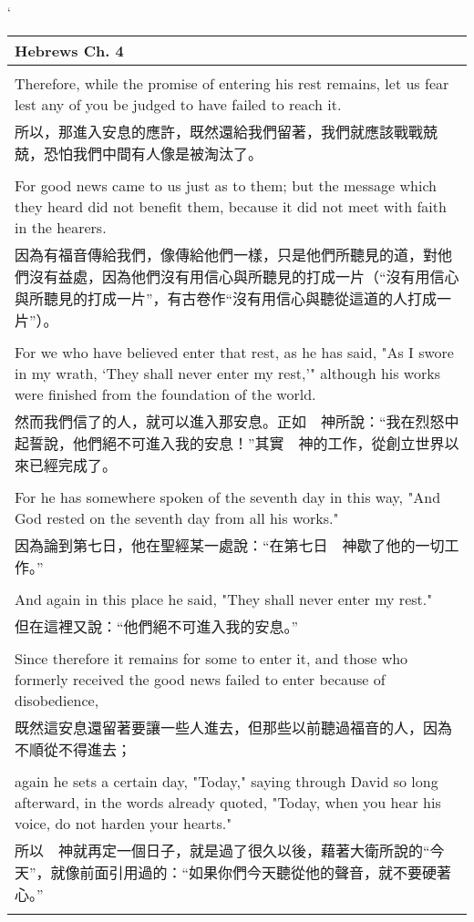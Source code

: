 \documentclass{book}
\begin{document}
\newpage
`
\begin{tabularx}{\textwidth}{p{}}
\hline
Hebrews Ch. 4 \\
\hline \\
Therefore, while the promise of entering his rest remains, let us fear lest any of you be judged to have failed to reach it. \\
所以，那進入安息的應許，既然還給我們留著，我們就應該戰戰兢兢，恐怕我們中間有人像是被淘汰了。 \\ \\
For good news came to us just as to them; but the message which they heard did not benefit them, because it did not meet with faith in the hearers. \\
因為有福音傳給我們，像傳給他們一樣，只是他們所聽見的道，對他們沒有益處，因為他們沒有用信心與所聽見的打成一片（“沒有用信心與所聽見的打成一片”，有古卷作“沒有用信心與聽從這道的人打成一片”）。 \\ \\
For we who have believed enter that rest, as he has said, "As I swore in my wrath, `They shall never enter my rest,'" although his works were finished from the foundation of the world. \\
然而我們信了的人，就可以進入那安息。正如　神所說：“我在烈怒中起誓說，他們絕不可進入我的安息！”其實　神的工作，從創立世界以來已經完成了。 \\ \\
For he has somewhere spoken of the seventh day in this way, "And God rested on the seventh day from all his works." \\
因為論到第七日，他在聖經某一處說：“在第七日　神歇了他的一切工作。” \\ \\
And again in this place he said, "They shall never enter my rest." \\
但在這裡又說：“他們絕不可進入我的安息。” \\ \\
Since therefore it remains for some to enter it, and those who formerly received the good news failed to enter because of disobedience, \\
既然這安息還留著要讓一些人進去，但那些以前聽過福音的人，因為不順從不得進去； \\ \\
again he sets a certain day, "Today," saying through David so long afterward, in the words already quoted, "Today, when you hear his voice, do not harden your hearts." \\
所以　神就再定一個日子，就是過了很久以後，藉著大衛所說的“今天”，就像前面引用過的：“如果你們今天聽從他的聲音，就不要硬著心。” \\ \\

\end{tabularx}
\end{document}
